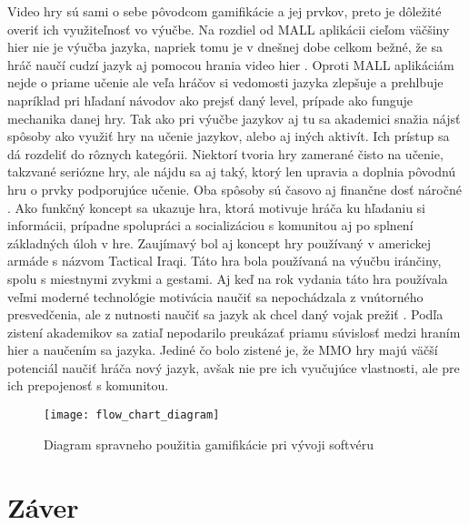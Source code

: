 \documentclass[10pt,slovak,a4paper]{article}
\begin{document}
Video hry sú sami o sebe pôvodcom gamifikácie a jej prvkov, preto je dôležité overiť ich využiteľnosť vo výučbe.
Na rozdiel od MALL aplikácii cieľom väčšiny hier nie je výučba jazyka, napriek tomu je v dnešnej dobe celkom bežné, že sa hráč naučí cudzí jazyk aj pomocou hrania video hier \cite{godwin2014games}. Oproti MALL aplikáciám nejde o priame učenie ale veľa hráčov si vedomosti jazyka zlepšuje a prehlbuje napríklad pri hľadaní návodov ako prejsť daný level, prípade ako funguje mechanika danej hry.
Tak ako pri výučbe jazykov aj tu sa akademici snažia nájsť spôsoby ako využiť hry na učenie jazykov, alebo aj iných aktivít. Ich prístup sa dá rozdeliť do rôznych kategórii. Niektorí tvoria hry zamerané čisto na učenie, takzvané seriózne hry, ale nájdu sa aj taký, ktorý len upravia  a doplnia pôvodnú hru o prvky podporujúce učenie. Oba spôsoby sú časovo aj finančne dosť náročné \cite{godwin2014games}.
Ako funkčný koncept sa ukazuje hra, ktorá motivuje hráča ku hľadaniu si informácii, prípadne spolupráci a socializáciou s komunitou aj po splnení základných úloh v hre.
Zaujímavý bol aj koncept hry používaný v americkej armáde s názvom Tactical Iraqi. Táto hra bola používaná na výučbu iránčiny, spolu s miestnymi zvykmi a gestami. Aj keď na rok vydania táto hra používala veľmi moderné technológie motivácia naučiť sa nepochádzala z vnútorného presvedčenia, ale z nutnosti naučiť sa jazyk ak chcel daný vojak prežiť \cite{losh2005country}.
Podľa zistení akademikov sa zatiaľ nepodarilo preukázať priamu súvislosť medzi hraním hier a naučením sa jazyka. Jediné čo bolo zistené je, že MMO hry majú väčší potenciál naučiť hráča nový jazyk, avšak nie pre ich vyučujúce vlastnosti, ale pre ich prepojenosť s komunitou.

\newpage
\begin{figure}
    \texttt{[image: flow\_chart\_diagram]}
    \caption{Diagram spravneho použitia gamifikácie pri vývoji softvéru}
    \label{flow_chart_diagram}
\end{figure}

\section{Záver} \label{conclusion}
\end{document}
